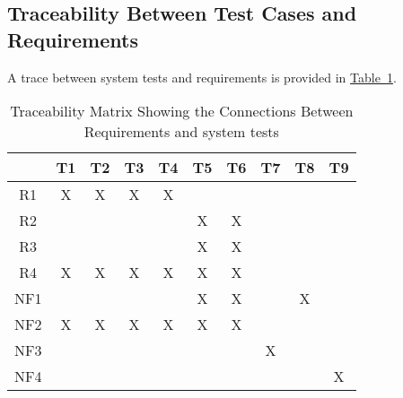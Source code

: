 \documentclass[12pt, titlepage]{article}
\begin{document}
\subsection{Traceability Between Test Cases and Requirements} A trace between
system tests and requirements is provided in
\hyperref[tab:reqtrace]{Table~\ref*{tab:reqtrace}}.

\begin{table}[h!]
\centering
\begin{tabular}{|c|c|c|c|c|c|c|c|c|c|}
\hline
	& T1 & T2 & T3 & T4 & T5 & T6 & T7 &T8  & T9 \\
\hline
R1  & X&X&X& X& & & & & \\ \hline
R2  & & & & & X& X& &  & \\ \hline
R3  & & & & &X & X& &   &\\ \hline
R4  &X & X& X& X&X & X& & & \\ \hline
NF1 & & & & & X& X& & X &  \\ \hline
NF2   & X& X& X&X & X& X& & & \\ \hline
NF3   & & & & & & &X & & \\ \hline
NF4   & & & & & & & & &X \\ \hline
\hline
\end{tabular}
\caption{Traceability Matrix Showing the Connections Between Requirements and system tests}
\label{tab:reqtrace}
\end{table}
\end{document}
